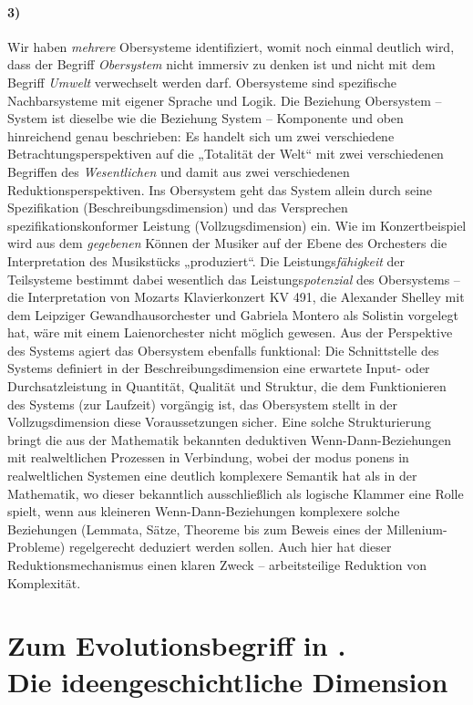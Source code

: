 \documentclass[11pt,a4paper]{article}
\begin{document}
\paragraph{3)}
Wir haben \emph{mehrere} Obersysteme identifiziert, womit noch einmal deutlich
wird, dass der Begriff \emph{Obersystem} nicht immersiv zu denken ist und
nicht mit dem Begriff \emph{Umwelt} verwechselt werden darf. Obersysteme sind
spezifische Nachbarsysteme mit eigener Sprache und Logik. Die Beziehung
Obersystem -- System ist dieselbe wie die Beziehung System -- Komponente und
oben hinreichend genau beschrieben: Es handelt sich um zwei verschiedene
Betrachtungsperspektiven auf die „Totalität der Welt“ mit zwei verschiedenen
Begriffen des \emph{Wesentlichen} und damit aus zwei verschiedenen
Reduktionsperspektiven. Ins Obersystem geht das System allein durch seine
Spezifikation (Beschreibungsdimension) und das Versprechen
spezifikationskonformer Leistung (Vollzugsdimension) ein. Wie im
Konzertbeispiel wird aus dem \emph{gegebenen} Können der Musiker auf der Ebene
des Orchesters die Interpretation des Musikstücks „produziert“.  Die
Leistungs\emph{fähigkeit} der Teilsysteme bestimmt dabei wesentlich das
Leistungs\emph{potenzial} des Obersystems -- die Interpretation von Mozarts
Klavierkonzert KV 491, die Alexander Shelley mit dem Leipziger
Gewandhausorchester und Gabriela Montero als Solistin vorgelegt hat, wäre mit
einem Laienorchester nicht möglich gewesen. Aus der Perspektive des Systems
agiert das Obersystem ebenfalls funktional: Die Schnittstelle des Systems
definiert in der Beschreibungsdimension eine erwartete Input- oder
Durchsatzleistung in Quantität, Qualität und Struktur, die dem Funktionieren
des Systems (zur Laufzeit) vorgängig ist, das Obersystem stellt in der
Vollzugsdimension diese Voraussetzungen sicher. Eine solche Strukturierung
bringt die aus der Mathematik bekannten deduktiven Wenn-Dann-Beziehungen mit
realweltlichen Prozessen in Verbindung, wobei der modus ponens in
realweltlichen Systemen eine deutlich komplexere Semantik hat als in der
Mathematik, wo dieser bekanntlich ausschließlich als logische Klammer eine
Rolle spielt, wenn aus kleineren Wenn-Dann-Beziehungen komplexere solche
Beziehungen (Lemmata, Sätze, Theoreme bis zum Beweis eines der
Millenium-Probleme) regelgerecht deduziert werden sollen.  Auch hier hat
dieser Reduktionsmechanismus einen klaren Zweck -- arbeitsteilige Reduktion
von Komplexität.

\section{Zum Evolutionsbegriff in \cite{TESE2018}.\\ Die ideengeschichtliche
  Dimension}
\end{document}

